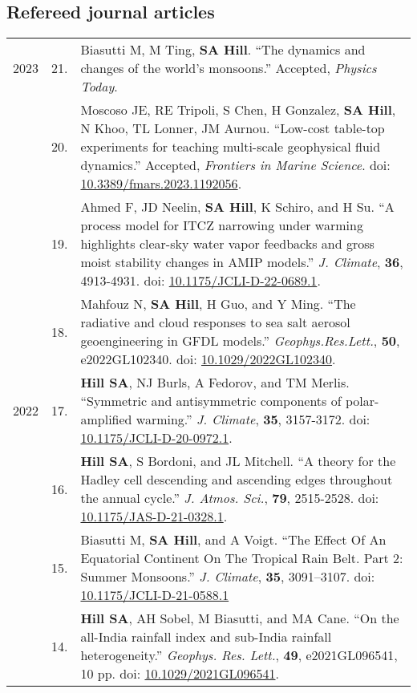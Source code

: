 \documentclass[letterpaper,11pt]{shillcv}
\begin{document}
\subsection*{Refereed journal articles}
\begin{longtable}{@{} Y{0.05\textwidth} >{\color{black}} p{0.04\textwidth} @{} L{0.91\textwidth} @{}}
2023 & 21. & Biasutti M, M Ting, \textbf{SA Hill}. ``The dynamics and changes of the world’s monsoons.''  Accepted, \emph{Physics Today}.\\
     & 20. & Moscoso JE, RE Tripoli, S Chen, H Gonzalez, \textbf{SA Hill}, N Khoo, TL Lonner, JM Aurnou. ``Low-cost table-top experiments for teaching
multi-scale geophysical fluid dynamics.''  Accepted, \emph{Frontiers in Marine Science}. doi:  \href{https://doi.org/10.3389/fmars.2023.1192056}{10.3389/fmars.2023.1192056}.\\
     & 19. & Ahmed F, JD Neelin, \textbf{SA Hill}, K Schiro, and H Su. ``A process model for ITCZ narrowing under warming highlights clear-sky water vapor feedbacks and gross moist stability changes in AMIP models.'' \emph{J. Climate}, \textbf{36}, 4913-4931.  doi: \href{https://doi.org/10.1175/JCLI-D-22-0689.1}{10.1175/JCLI-D-22-0689.1}.\\
     & 18. & Mahfouz N, \textbf{SA Hill}, H Guo, and Y Ming. ``The radiative and cloud responses to sea salt aerosol geoengineering in GFDL models.''  \emph{Geophys.\@ Res.\@ Lett.}, \textbf{50}, e2022GL102340.  doi: \href{https://doi.org/10.1029/2022GL102340}{10.1029/2022GL102340}.\\
2022 & 17. & \textbf{Hill SA}, NJ Burls, A Fedorov, and TM Merlis.  ``Symmetric and antisymmetric components of polar-amplified warming.''  \emph{J. Climate}, \textbf{35}, 3157-3172.  doi: \href{https://doi.org/10.1175/JCLI-D-20-0972.1}{10.1175/JCLI-D-20-0972.1}.\\
     & 16. & \textbf{Hill SA}, S Bordoni, and JL Mitchell.  ``A theory for the Hadley cell descending and ascending edges throughout the annual cycle.''  \emph{J. Atmos. Sci.}, \textbf{79}, 2515-2528.  doi: \href{https://doi.org/10.1175/JAS-D-21-0328.1}{10.1175/JAS-D-21-0328.1}.\\
     & 15. & Biasutti M, \textbf{SA Hill}, and A Voigt.  ``The Effect Of An Equatorial Continent On The Tropical Rain Belt. Part 2: Summer Monsoons.''  \emph{J. Climate}, \textbf{35}, 3091–3107.  doi: \href{https://doi.org/10.1175/JCLI-D-21-0588.1}{10.1175/JCLI-D-21-0588.1}\\
     & 14. & \textbf{Hill SA}, AH Sobel, M Biasutti, and MA Cane.  ``On the all-India rainfall index and sub-India rainfall heterogeneity.''  \emph{Geophys. Res. Lett.}, \textbf{49}, e2021GL096541, 10 pp.  doi: \href{https://doi.org/10.1029/2021GL096541}{10.1029/2021GL096541}.\\

\end{longtable}
\end{document}
